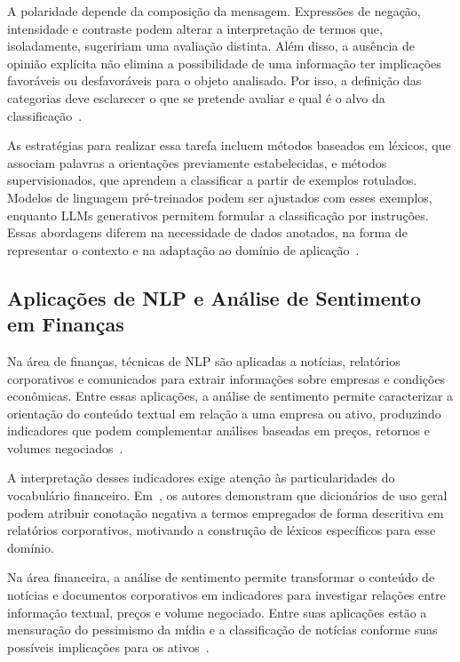 A polaridade depende da composição da mensagem. Expressões de negação, intensidade e contraste podem alterar a interpretação de termos que, isoladamente, sugeririam uma avaliação distinta. Além disso, a ausência de opinião explícita não elimina a possibilidade de uma informação ter implicações favoráveis ou desfavoráveis para o objeto analisado. Por isso, a definição das categorias deve esclarecer o que se pretende avaliar e qual é o alvo da classificação~\cite{du2024financial}.

As estratégias para realizar essa tarefa incluem métodos baseados em léxicos, que associam palavras a orientações previamente estabelecidas, e métodos supervisionados, que aprendem a classificar a partir de exemplos rotulados. Modelos de linguagem pré-treinados podem ser ajustados com esses exemplos, enquanto LLMs generativos permitem formular a classificação por instruções. Essas abordagens diferem na necessidade de dados anotados, na forma de representar o contexto e na adaptação ao domínio de aplicação~\cite{pang2008opinion,brown2020language}.

\subsection{Aplicações de NLP e Análise de Sentimento em Finanças}
\label{subsec:nlp_financas}

Na área de finanças, técnicas de NLP são aplicadas a notícias,
relatórios corporativos e comunicados para extrair informações
sobre empresas e condições econômicas. Entre essas aplicações,
a análise de sentimento permite caracterizar a orientação do
conteúdo textual em relação a uma empresa ou ativo, produzindo
indicadores que podem complementar análises baseadas em preços,
retornos e volumes negociados~\cite{du2024financial}.

A interpretação desses indicadores exige atenção às
particularidades do vocabulário financeiro. Em~\cite{loughran2011}, os autores demonstram que dicionários de uso geral podem atribuir conotação negativa a termos empregados de forma descritiva em relatórios corporativos, motivando a construção de léxicos específicos para esse domínio.

Na área financeira, a análise de sentimento permite transformar
o conteúdo de notícias e documentos corporativos em indicadores
para investigar relações entre informação textual, preços e volume
negociado. Entre suas aplicações estão a mensuração do pessimismo
da mídia e a classificação de notícias conforme suas possíveis
implicações para os ativos~\cite{tetlock2007,lopezlira2023chatgpt}.

